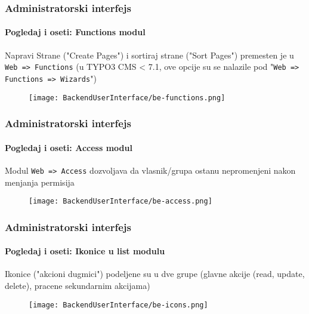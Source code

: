 \begin{frame}[fragile]
	\frametitle{Administratorski interfejs}
	\framesubtitle{Pogledaj i oseti: Functions modul}

	Napravi Strane ("Create Pages") i sortiraj strane ("Sort Pages") premesten je u \texttt{Web => Functions}\newline
	\smaller (u TYPO3 CMS < 7.1, ove opcije su se nalazile pod "\texttt{Web => Functions => Wizards}")

	\begin{figure}
		\texttt{[image: BackendUserInterface/be-functions.png]}
	\end{figure}


\end{frame}


\begin{frame}[fragile]
	\frametitle{Administratorski interfejs}
	\framesubtitle{Pogledaj i oseti: Access modul}

	Modul \texttt{Web => Access} dozvoljava da vlasnik/grupa ostanu nepromenjeni\newline
	nakon menjanja permisija

	\begin{figure}
		\texttt{[image: BackendUserInterface/be-access.png]}
	\end{figure}

\end{frame}


\begin{frame}[fragile]
	\frametitle{Administratorski interfejs}
	\framesubtitle{Pogledaj i oseti: Ikonice u list modulu}

	Ikonice ("akcioni dugmici") podeljene su u dve grupe \newline
	\smaller (glavne akcije (read, update, delete), pracene sekundarnim akcijama)

	\begin{figure}
		\texttt{[image: BackendUserInterface/be-icons.png]}
	\end{figure}

\end{frame}

